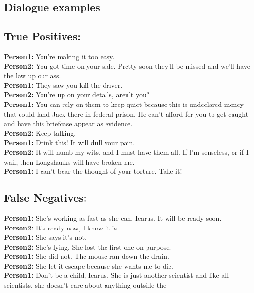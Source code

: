 \documentclass[
	letterpaper, %
	12pt, %
	unnumberedsections, %
	twoside, %
]{LTJournalArticle}
\begin{document}
\begin{appendices}
	\section{Dialogue examples}\label{appendix:DialogueExamples}
	\subsection{True Positives:}
	{\ttfamily \tiny
		\noindent\textbf{Person1:}  You're making it too easy. \\
		\noindent\textbf{Person2:}  You got time on your side.  Pretty soon they'll be missed and we'll have the law up our ass. \\
		\noindent\textbf{Person1:}  They saw you kill the driver. \\
		\noindent\textbf{Person2:}  You're up on your details, aren't you? \\
		\noindent\textbf{Person1:}  You can rely on them to keep quiet because this is undeclared money that could land Jack there in federal prison.  He can't afford for you to get caught and have this briefcase appear as evidence. \\
		\noindent\textbf{Person2:}  Keep talking. \\

		\noindent\textbf{Person1:}  Drink this! It will dull your pain. \\
		\noindent\textbf{Person2:}  It will numb my wits, and I must have them all. If I'm senseless, or if I wail, then Longshanks will have broken me. \\
		\noindent\textbf{Person1:}  I can't bear the thought of your torture. Take it! \\


	}

	\subsection{False Negatives:}
	{\ttfamily \tiny
		\noindent\textbf{Person1:}  She's working as fast as she can, Icarus.  It will be ready soon. \\
		\noindent\textbf{Person2:}  It's ready now, I know it is. \\
		\noindent\textbf{Person1:}  She says it's not. \\
		\noindent\textbf{Person2:}  She's lying.  She lost the first one on purpose. \\
		\noindent\textbf{Person1:}  She did not.  The mouse ran down the drain. \\
		\noindent\textbf{Person2:}  She let it escape because she wants me to die. \\
		\noindent\textbf{Person1:}  Don't be a child, Icarus.  She is just another scientist and like all scientists, she doesn't care about anything outside the \\

}
\end{appendices}
\end{document}
